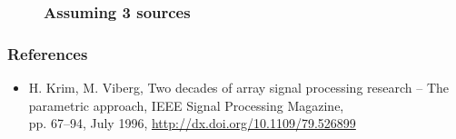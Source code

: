 \documentclass{beamer}
\begin{document}
\begin{frame}
	\begin{figure}
    	\frametitle{Assuming 3 sources}
    	\label{some example}
	\end{figure}
    
\end{frame}

\begin{frame}
	\frametitle{References}
	\begin{itemize}
		\item H. Krim, M. Viberg, Two decades of array signal processing research 
		– The parametric approach, IEEE Signal Processing Magazine,\\ pp. 67–94, July 1996, 
		\url{http://dx.doi.org/10.1109/79.526899}
	\end{itemize}
\end{frame}
\end{document}
